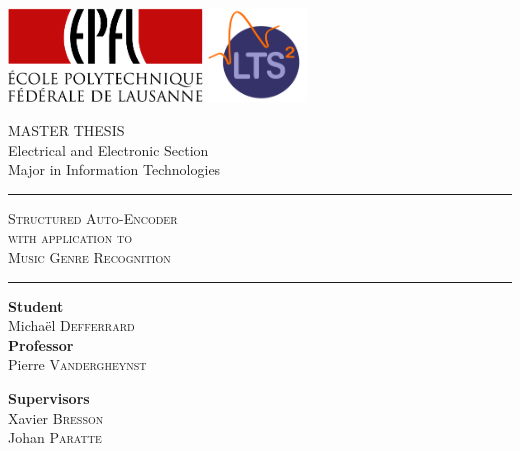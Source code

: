 \documentclass[a4paper,12pt,oneside]{report}
\newcommand{\HRule}{\rule{\linewidth}{0.5mm}}
\begin{document}
\begin{titlepage}
	
	\includegraphics[height=2.5cm]{img/logo_epfl}
	\hfill
	\includegraphics[height=2.5cm]{img/logo_lts2}
	\vspace{1.2cm}
	
	\begin{center}
		
		\textsc{\LARGE MASTER THESIS}\\
		\vspace{0.5cm}
		\large Electrical and Electronic Section\\
		\large Major in Information Technologies\\
		\vspace{0.8cm}
		
		\HRule
		\vspace{0.9cm}
		\textsc{\Huge Structured Auto-Encoder}\\
		\vspace{0.5cm}
		\textsc{\Large with application to}\\
		\vspace{0.2cm}
		\textsc{\Large Music Genre Recognition}\\
		\vspace{0.6cm}
		\HRule
		\vspace{1.3cm}
		
		\begin{minipage}{0.45\textwidth}
			\begin{flushleft} \large
				\textbf{Student}\\ \vspace{0.5ex}
				Michaël \textsc{Defferrard} \\ \vspace{2.5ex}
				\textbf{Professor} \\ \vspace{0.5ex}
				Pierre \textsc{Vandergheynst}
			\end{flushleft}
		\end{minipage}
		\begin{minipage}{0.45\textwidth}
			\begin{flushright} \large
				\textbf{Supervisors} \\ \vspace{0.5ex}
				Xavier \textsc{Bresson} \\ \vspace{0.2ex}
				Johan \textsc{Paratte}
			\end{flushright}
		\end{minipage}
		

\end{center}
\end{titlepage}
\end{document}
